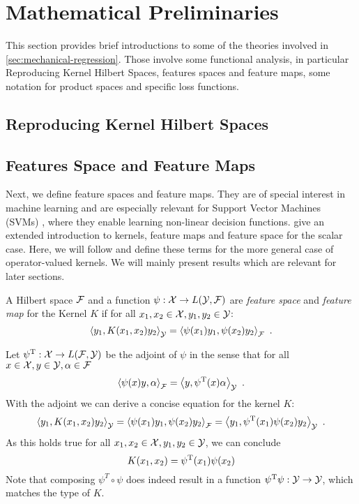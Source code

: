 \section{Mathematical Preliminaries}

This section provides brief introductions to some of the theories involved in \cref{sec:mechanical-regression}.
Those involve some functional analysis, in particular Reproducing Kernel Hilbert Spaces, features spaces and feature maps, some notation for product spaces and specific loss functions.

\subsection{Reproducing Kernel Hilbert Spaces}



\subsection{Features Space and Feature Maps}

Next, we define feature spaces and feature maps.
They are of special interest in machine learning and are especially relevant for Support Vector Machines (SVMs) \cite{steinwart08}, where they enable learning non-linear decision functions.
\citet{steinwart08} give an extended introduction to kernels, feature maps and feature space for the scalar case.
Here, we will follow \cite{owhadi20} and define these terms for the more general case of operator-valued kernels.
We will mainly present results which are relevant for later sections.

\begin{definition}
	\label{def:feature-map-space}
	A Hilbert space $\mathcal{F}$ and a function $\psi: \mathcal{X} \rightarrow L(\mathcal{Y}, \mathcal{F})$ are \emph{feature space} and \emph{feature map} for the Kernel $K$ if for all $x_1, x_2 \in \mathcal{X}, y_1, y_2 \in \mathcal{Y}$:
	\begin{equation}
		\left< y_1, K(x_1, x_2) y_2\right>_{\mathcal{Y}} = \left< \psi(x_1) y_1, \psi(x_2) y_2\right>_{\mathcal{F}} \ .
	\end{equation}
\end{definition}

Let $\psi^{\mathrm{T}}: \mathcal{X} \rightarrow L(\mathcal{F}, \mathcal{Y})$ be the adjoint of $\psi$ in the sense that for all $x \in \mathcal{X}, y\in \mathcal{Y}, \alpha \in \mathcal{F}$
\begin{equation}
 \left< \psi(x)y, \alpha\right>_{\mathcal{F}} = \left<y, \psi^{\mathrm{T}}(x) \alpha \right>_{\mathcal{Y}} \ .
\end{equation}
With the adjoint we can derive a concise equation for the kernel $K$:
\begin{align}
	\left< y_1, K(x_1, x_2) y_2\right>_{\mathcal{Y}} = \left< \psi(x_1) y_1, \psi(x_2) y_2\right>_{\mathcal{F}} = \left<y_1, \psi^{\mathrm{T}}(x_1)\psi(x_2) y_2\right>_{\mathcal{Y}} \ .
\end{align}
As this holds true for all $x_1, x_2 \in \mathcal{X}, y_1, y_2 \in \mathcal{Y}$, we can conclude
\begin{equation}
\label{eq:kernel-feature-map}
K(x_1, x_2) = \psi^{\mathrm{T}}(x_1) \psi(x_2)
\end{equation}
Note that composing $\psi^T \circ \psi$ does indeed result in a function $\psi^{\mathrm{T}}\psi: \mathcal{Y} \rightarrow \mathcal{Y}$, which matches the type of $K$.

